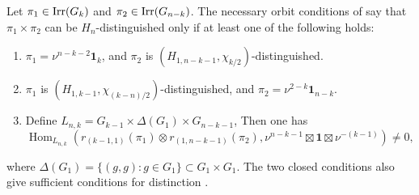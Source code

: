 \documentclass[11pt,leqno]{amsart}
\numberwithin{equation}{section}
\theoremstyle{plain}
\theoremstyle{definition}
\theoremstyle{remark}
\DeclareMathOperator{\Hom}{Hom}
\newcommand{\one}{\mathbf{1}}
\begin{document}
	Let $\pi_1\in {\rm Irr}(G_k)$ and $\pi_2\in {\rm Irr}(G_{n-k})$.
	The necessary orbit conditions of \cite[Lemma 2.8]{DSV} say that
	$\pi_1\times\pi_2$ can be $H_n$-distinguished only if at least
	one of the following holds:
	\begin{enumerate}[label=(\alph*)]
		\item\label{orb:a}
		$\pi_1=\nu^{n-k-2}\one_k$, and $\pi_2$ is
		$(H_{1,n-k-1},\chi_{k/2})$-distinguished.
		\item\label{orb:b}
		$\pi_1$ is $(H_{1,k-1},\chi_{(k-n)/2})$-distinguished, and
		$\pi_2=\nu^{2-k}\one_{n-k}$.
		\item \label{orb:c}
		Define $L_{n,k}=G_{k-1}\times\Delta(G_1)\times G_{n-k-1}$,
		Then one has
		\begin{equation}\label{eq:open-general}
			\Hom_{L_{n,k}}\left(
			r_{(k-1,1)}(\pi_1)\otimes r_{(1,n-k-1)}(\pi_2),
			\nu^{n-k-1}\boxtimes\one \boxtimes\nu^{-(k-1)}
			\right)\ne0,
		\end{equation}
	\end{enumerate}
	where $\Delta(G_1)=\{(g,g): g\in G_1\} \subset G_1\times G_1$.
	The two closed conditions also give sufficient conditions for distinction \cite[Lemma 2.9]{DSV}.
	
\end{document}
